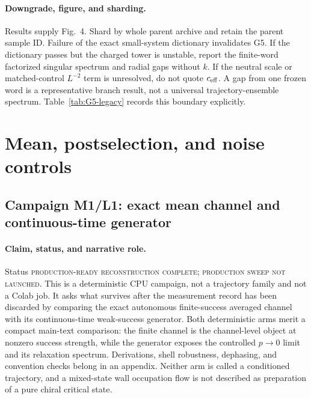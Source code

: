 \documentclass[aps,prx,twocolumn,floatfix,nofootinbib,superscriptaddress,longbibliography]{revtex4-2}
\begin{document}
\paragraph*{Downgrade, figure, and sharding.}
Results supply Fig.~4.  Shard by whole parent archive and retain the parent sample ID.
Failure of the exact small-system dictionary invalidates G5.  If the dictionary passes but
the charged tower is unstable, report the finite-word factorized singular spectrum and
radial gaps without $k$.  If the neutral scale or matched-control $L^{-2}$ term is
unresolved, do not quote $c_{\rm eff}$.  A gap from one frozen word is a representative
branch result, not a universal trajectory-ensemble spectrum.  Table~\ref{tab:G5-legacy}
records this boundary explicitly.

\section{Mean, postselection, and noise controls}

\subsection{Campaign M1/L1: exact mean channel and continuous-time generator}
\label{camp:M1}
\paragraph*{Claim, status, and narrative role.}
Status \textsc{production-ready reconstruction complete; production sweep not launched}.
This is a deterministic CPU campaign, not a trajectory family and not a Colab job.  It
asks what survives after the measurement record has been discarded by
comparing the exact autonomous finite-success averaged channel with its continuous-time
weak-success generator.  Both deterministic arms merit a compact main-text comparison:
the finite channel is the channel-level object at nonzero success strength, while the
generator exposes the controlled $p\to0$ limit and its relaxation spectrum.  Derivations,
shell robustness, dephasing, and convention checks belong in an appendix.  Neither arm is
called a conditioned trajectory, and a mixed-state wall occupation flow is not described
as preparation of a pure chiral critical state.
\end{document}
